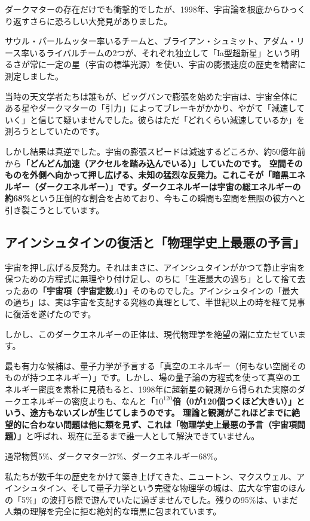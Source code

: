ダークマターの存在だけでも衝撃的でしたが、1998年、宇宙論を根底からひっくり返すさらに恐ろしい大発見がありました。

サウル・パールムッター率いるチームと、ブライアン・シュミット、アダム・リース率いるライバルチームの2つが、それぞれ独立して「Ia型超新星」という明るさが常に一定の星（宇宙の標準光源）を使い、宇宙の膨張速度の歴史を精密に測定しました。

当時の天文学者たちは誰もが、ビッグバンで膨張を始めた宇宙は、宇宙全体にある星やダークマターの「引力」によってブレーキがかかり、やがて「減速していく」と信じて疑いませんでした。彼らはただ「どれくらい減速しているか」を測ろうとしていたのです。

しかし結果は真逆でした。宇宙の膨張スピードは減速するどころか、約50億年前から\textbf{「どんどん加速（アクセルを踏み込んでいる）」していたのです。 空間そのものを外側へ向かって押し広げる、未知の猛烈な反発力。これこそが「暗黒エネルギー（ダークエネルギー）」です。ダークエネルギーは宇宙の総エネルギーの約68\%}という圧倒的な割合を占めており、今もこの瞬間も空間を無限の彼方へと引き裂こうとしています。

\subsection{アインシュタインの復活と「物理学史上最悪の予言」}

宇宙を押し広げる反発力。それはまさに、アインシュタインがかつて静止宇宙を保つための方程式に無理やり付け足し、のちに「生涯最大の過ち」として捨て去ったあの\textbf{「宇宙項（宇宙定数\(\Lambda\)）」}そのものでした。アインシュタインの「最大の過ち」は、実は宇宙を支配する究極の真理として、半世紀以上の時を経て見事に復活を遂げたのです。

しかし、このダークエネルギーの正体は、現代物理学を絶望の淵に立たせています。

最も有力な候補は、量子力学が予言する「真空のエネルギー（何もない空間そのものが持つエネルギー）」です。しかし、場の量子論の方程式を使って真空のエネルギー密度を素朴に見積もると、1998年に超新星の観測から得られた実際のダークエネルギーの密度よりも、なんと\textbf{「\(10^{120}\)倍（0が120個つくほど大きい）」という、途方もないズレが生じてしまうのです。 理論と観測がこれほどまでに絶望的に合わない問題は他に類を見ず、これは「物理学史上最悪の予言（宇宙項問題）」}と呼ばれ、現在に至るまで誰一人として解決できていません。

通常物質5\%、ダークマター27\%、ダークエネルギー68\%。

私たちが数千年の歴史をかけて築き上げてきた、ニュートン、マクスウェル、アインシュタイン、そして量子力学という完璧な物理学の城は、広大な宇宙のほんの「5\%」の波打ち際で遊んでいたに過ぎませんでした。残りの95\%は、いまだ人類の理解を完全に拒む絶対的な暗黒に包まれています。

